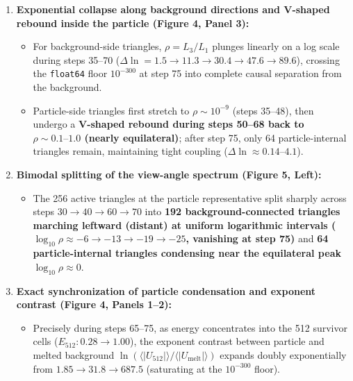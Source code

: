 \documentclass[
  a4paper,
]{article}
\providecommand{\tightlist}{%
  \setlength{\itemsep}{0pt}\setlength{\parskip}{0pt}}
\begin{document}
\begin{enumerate}
\def\labelenumi{\arabic{enumi}.}
\tightlist
\item
  \textbf{Exponential collapse along background directions and V-shaped
  rebound inside the particle (Figure 4, Panel 3):}

  \begin{itemize}
  \tightlist
  \item
    For background-side triangles, \(\rho = L_3/L_1\) plunges linearly
    on a log scale during steps 35--70
    (\(\Delta\ln = 1.5 \to 11.3 \to 30.4 \to 47.6 \to 89.6\)), crossing
    the \texttt{float64} floor \(10^{-300}\) at step 75 into complete
    causal separation from the background.
  \item
    Particle-side triangles first stretch to \(\rho \sim 10^{-9}\)
    (steps 35--48), then undergo a \textbf{V-shaped rebound during steps
    50--68 back to \(\rho \sim 0.1\text{–}1.0\) (nearly equilateral)};
    after step 75, only 64 particle-internal triangles remain,
    maintaining tight coupling (\(\Delta\ln \approx 0.14\text{–}4.1\)).
  \end{itemize}
\item
  \textbf{Bimodal splitting of the view-angle spectrum (Figure 5,
  Left):}

  \begin{itemize}
  \tightlist
  \item
    The 256 active triangles at the particle representative split
    sharply across steps \(30 \to 40 \to 60 \to 70\) into \textbf{192
    background-connected triangles marching leftward (distant) at
    uniform logarithmic intervals
    (\(\log_{10}\rho \approx -6 \to -13 \to -19 \to -25\), vanishing at
    step 75)} and \textbf{64 particle-internal triangles condensing near
    the equilateral peak \(\log_{10}\rho \approx 0\)}.
  \end{itemize}
\item
  \textbf{Exact synchronization of particle condensation and exponent
  contrast (Figure 4, Panels 1--2):}

  \begin{itemize}
  \tightlist
  \item
    Precisely during steps 65--75, as energy concentrates into the 512
    survivor cells (\(E_{512}: 0.28 \to 1.00\)), the exponent contrast
    between particle and melted background
    \(\ln(\langle|U_{512}|\rangle / \langle|U_{\text{melt}}|\rangle)\)
    expands doubly exponentially from \(1.85 \to 31.8 \to 687.5\)
    (saturating at the \(10^{-300}\) floor).
  \end{itemize}
\end{enumerate}
\end{document}
